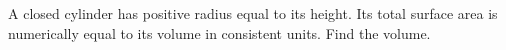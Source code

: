 A closed cylinder has positive radius equal to its height. Its total surface area is numerically equal to its volume in consistent units. Find the volume.
